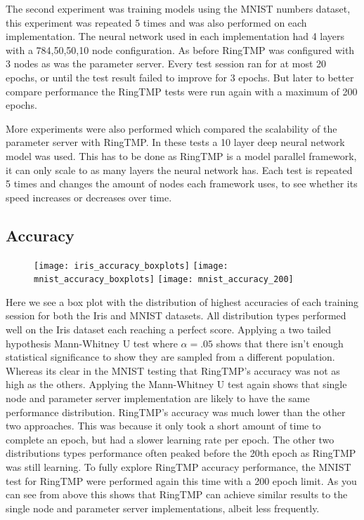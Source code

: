 The second experiment was training models using the MNIST numbers dataset, this
experiment was repeated 5 times and was also performed on each implementation.
The neural network used in each implementation had 4 layers with a 784,50,50,10
node configuration. As before RingTMP was configured with 3 nodes as was the
parameter server. Every test session ran for at most 20 epochs, or until the
test result failed to improve for 3 epochs. But later to better compare
performance the RingTMP tests were run again with a maximum of 200 epochs.

More experiments were also performed which compared the scalability of the
parameter server with RingTMP. In these tests a 10 layer deep neural network
model was used. This has to be done as RingTMP is a model parallel framework, it
can only scale to as many layers the neural network has. Each test is repeated 5
times and changes the amount of nodes each framework uses, to see whether its
speed increases or decreases over time.
 

\subsection{Accuracy}

\begin{figure}[h]
    \centering
    \texttt{[image: iris\_accuracy\_boxplots]}
    \texttt{[image: mnist\_accuracy\_boxplots]}
    \texttt{[image: mnist\_accuracy\_200]}
\end{figure}

Here we see a box plot with the distribution of highest accuracies of each
training session for both the Iris and MNIST datasets. All distribution types
performed well on the Iris dataset each reaching a perfect score. Applying a two
tailed hypothesis Mann-Whitney U test where \(\alpha = .05\) shows that there
isn't enough statistical significance to show they are sampled from a different
population. Whereas its clear in the MNIST testing that RingTMP's accuracy was
not as high as the others. Applying the Mann-Whitney U test again shows that
single node and parameter server implementation are likely to have the same
performance distribution. RingTMP's accuracy was much lower than the other two
approaches. This was because it only took a short amount of time to complete an
epoch, but had a slower learning rate per epoch. The other two distributions
types performance often peaked before the 20th epoch as RingTMP was still
learning. To fully explore RingTMP accuracy performance, the MNIST test for
RingTMP were performed again this time with a 200 epoch limit. As you can see
from above this shows that RingTMP can achieve similar results to the single
node and parameter server implementations, albeit less frequently.

